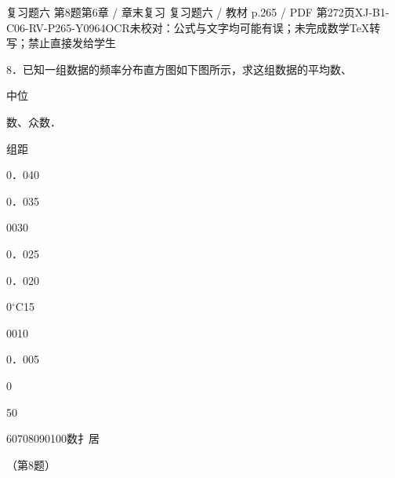 \begin{bankitem}{复习题六 第8题}{第6章 / 章末复习 复习题六 / 教材 p.265 / PDF 第272页}{XJ-B1-C06-RV-P265-Y0964}{OCR未校对：公式与文字均可能有误；未完成数学TeX转写；禁止直接发给学生}
\begin{ocrdraft}
\par
8．已知一组数据的频率分布直方图如下图所示，求这组数据的平均数、
\par
中位
\par
数、众数．
\par
组距
\par
0．040
\par
0．035
\par
0030
\par
0．025
\par
0．020
\par
0\ensuremath{{}^\circ\mathrm C}15
\par
0010
\par
0．005
\par
0
\par
50
\par
60708090100数扌居
\par
（第8题）
\end{ocrdraft}
\end{bankitem}
